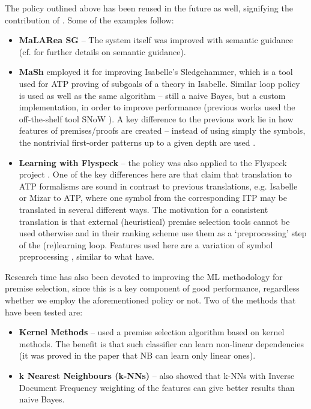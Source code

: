 \documentclass{article}
\begin{document}
The policy outlined above has been reused in the future as well, signifying the
contribution of \cite{MaLARea}. Some of the examples follow:
\begin{itemize}
    \item \textbf{MaLARea SG} \cite{MaLAReaSG} -- The system itself was
        improved with semantic guidance (cf. \cite{SRASS} for further details
        on semantic guidance).
    \item \textbf{MaSh} \cite{MaSh} employed it for improving Isabelle's
        Sledgehammer, which is a tool used for ATP proving of subgoals of
        a theory in Isabelle. Similar loop policy is used \citep[p.3]{MaSh} as
        well as the same algorithm -- still a naive Bayes, but a custom
        implementation, in order to improve performance (previous works used
        the off-the-shelf tool SNoW \citep{SNoW}).  A key difference to the
        previous work lie in how features of premises/proofs are created --
        instead of using simply the symbols, the nontrivial first-order
        patterns up to a given depth are used \citep[p.6]{MaSh}.
    \item \textbf{Learning with Flyspeck } -- the policy was also applied to
        the Flyspeck project \citep{FlyspeckProject}. One of the key differences
        here are that \cite{Flyspeck} claim that translation to ATP formalisms
        are sound in contrast to previous translations, e.g. Isabelle or Mizar
        to ATP, where one symbol from the corresponding ITP may be translated
        in several different ways. The motivation for a consistent translation
        is that external (heuristical) premise selection tools cannot be used
        otherwise and in their ranking scheme \cite{Flyspeck} use them as
        a `preprocessing' step of the (re)learning loop. Features used here are
        a variation of symbol preprocessing \citep[\S 4.1]{Flyspeck}, similar
        to what \cite{MaLARea} have.
\end{itemize}

Research time has also been devoted to improving the ML methodology for
premise selection, since this is a key component of good performance,
regardless whether we employ the aforementioned policy or not. Two of the
methods that have been tested are:
\begin{itemize}
    \item \textbf{Kernel Methods} -- \cite{PremiseSelection} used a premise
        selection algorithm based on kernel methods. The benefit is that such
        classifier can learn non-linear dependencies (it was proved in the
        paper that NB can learn only linear ones). 
    \item \textbf{k Nearest Neighbours (k-NNs)} -- \cite{FlyspeckFeatW} also
        showed that k-NNs with Inverse Document Frequency weighting of the
        features can give better results than naive Bayes. 
\end{itemize}
\end{document}
